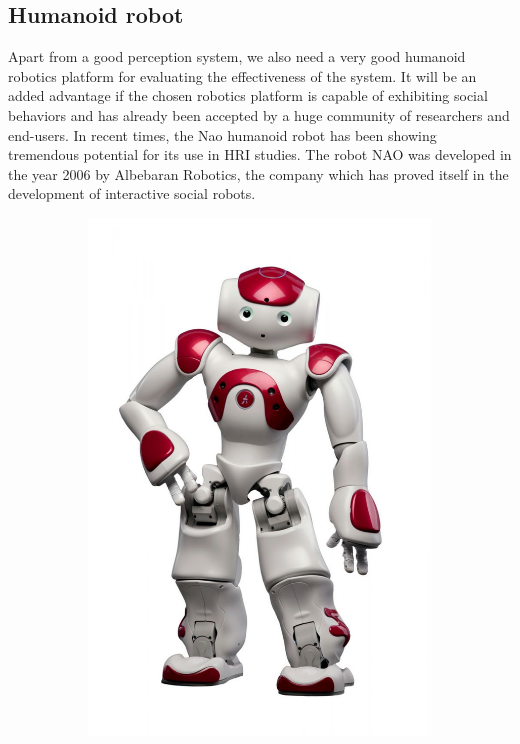 \subsection{Humanoid robot}
Apart from a good perception system, we also need a very good humanoid robotics platform for evaluating the effectiveness of the system. It will be an added advantage if the chosen robotics platform is capable of exhibiting social behaviors and has already been accepted by a huge community of researchers and end-users. In recent times, the Nao humanoid robot \cite{NaoRobot} has been showing tremendous potential for its use in HRI studies. The robot NAO was developed in the year 2006 by Albebaran Robotics, the company which has proved itself in the development of interactive social robots.
\begin{figure}[H]
\centering
\begin{subfigure}[b]{0.25\textwidth}
\includegraphics[width=\textwidth]{assets/nao_image1.jpg}

\end{subfigure}
\end{figure}
